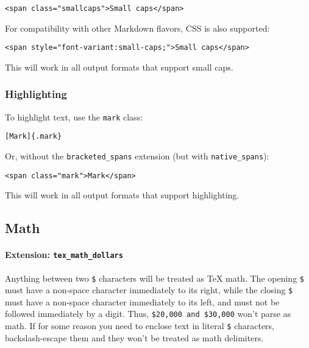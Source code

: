 \documentclass[
  a4paper,
]{article}
\begin{document}
\begin{verbatim}
<span class="smallcaps">Small caps</span>
\end{verbatim}

For compatibility with other Markdown flavors, CSS is also supported:

\begin{verbatim}
<span style="font-variant:small-caps;">Small caps</span>
\end{verbatim}

This will work in all output formats that support small caps.

\hypertarget{highlighting}{%
\subsubsection{Highlighting}\label{highlighting}}

To highlight text, use the \texttt{mark} class:

\begin{verbatim}
[Mark]{.mark}
\end{verbatim}

Or, without the \texttt{bracketed\_spans} extension (but with
\texttt{native\_spans}):

\begin{verbatim}
<span class="mark">Mark</span>
\end{verbatim}

This will work in all output formats that support highlighting.

\hypertarget{math}{%
\subsection{Math}\label{math}}

\hypertarget{extension-tex_math_dollars}{%
\paragraph{\texorpdfstring{Extension:
\texttt{tex\_math\_dollars}}{Extension: tex\_math\_dollars}}\label{extension-tex_math_dollars}}

Anything between two \texttt{\$} characters will be treated as TeX math.
The opening \texttt{\$} must have a non-space character immediately to
its right, while the closing \texttt{\$} must have a non-space character
immediately to its left, and must not be followed immediately by a
digit. Thus, \texttt{\$20,000\ and\ \$30,000} won't parse as math. If
for some reason you need to enclose text in literal \texttt{\$}
characters, backslash-escape them and they won't be treated as math
delimiters.
\end{document}

